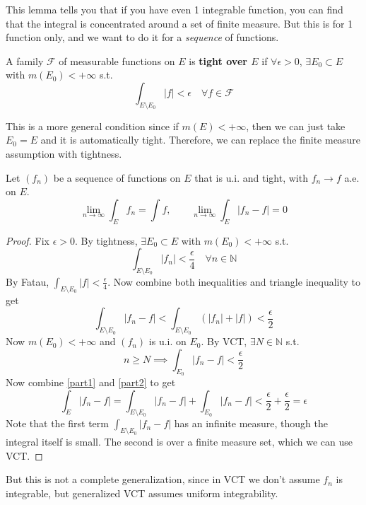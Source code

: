   This lemma tells you that if you have even 1 integrable function, you can find that the integral is concentrated around a set of finite measure. But this is for 1 function only, and we want to do it for a \textit{sequence} of functions. 

  \begin{definition}[Tight]
    A family $\mathscr{F}$ of measurable functions on $E$ is \textbf{tight over $E$} if $\forall \epsilon > 0$, $\exists E_0 \subset E$ with $m(E_0) < +\infty$ s.t. 
    \begin{equation}
      \int_{E \setminus E_0} |f| < \epsilon \quad \forall f \in \mathscr{F}
    \end{equation}
  \end{definition}

  This is a more general condition since if $m(E) < +\infty$, then we can just take $E_0 = E$ and it is automatically tight. Therefore, we can replace the finite measure assumption with tightness. 

  \begin{theorem}
    Let $(f_n)$ be a sequence of functions on $E$ that is u.i. and tight, with $f_n \to f$ a.e. on $E$. 
    \begin{equation}
      \lim_{n \to \infty} \int_E f_n = \int f, \qquad \lim_{n \to \infty} \int_E |f_n - f| = 0
    \end{equation}
  \end{theorem}
  \begin{proof}
    Fix $\epsilon > 0$. By tightness, $\exists E_0 \subset E$ with $m(E_0) < +\infty$ s.t. 
    \begin{equation}
      \int_{E \setminus E_0} |f_n| < \frac{\epsilon}{4} \quad \forall n \in \mathbb{N}
    \end{equation}
    By Fatau, $\int_{E \setminus E_0} |f| < \frac{\epsilon}{4}$. Now combine both inequalities and triangle inequality to get 
    \begin{equation}
      \int_{E \setminus E_0} |f_n - f| < \int_{E \setminus E_0} (|f_n| + |f|) < \frac{\epsilon}{2} \label{part1}
    \end{equation}
    Now $m(E_0) < +\infty$ and $(f_n)$ is u.i. on $E_0$. By VCT, $\exists N \in \mathbb{N}$ s.t. 
    \begin{equation}
      n \geq N \implies \int_{E_0}  |f_n - f| < \frac{\epsilon}{2} \label{part2}
    \end{equation}
    Now combine \ref{part1} and \ref{part2} to get 
    \begin{equation}
      \int_{E} |f_n - f| = \int_{E \setminus E_0} |f_n - f| + \int_{E_0} |f_n - f| < \frac{\epsilon}{2} + \frac{\epsilon}{2} = \epsilon
    \end{equation}
    Note that the first term $\int_{E \setminus E_0} |f_n - f|$ has an infinite measure, though the integral itself is small. The second is over a finite measure set, which we can use VCT. 
  \end{proof}

  But this is not a complete generalization, since in VCT we don't assume $f_n$ is integrable, but generalized VCT assumes uniform integrability. 

